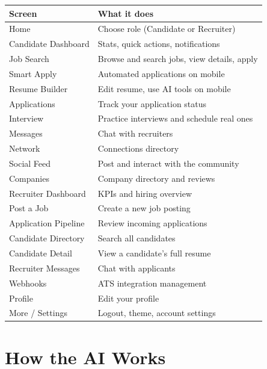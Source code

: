 \documentclass[12pt, a4paper]{report}
\begin{document}
\begin{center}
\begin{tabularx}{\textwidth}{lX}
\toprule
\textbf{Screen} & \textbf{What it does} \\
\midrule
Home                & Choose role (Candidate or Recruiter) \\
Candidate Dashboard & Stats, quick actions, notifications \\
Job Search          & Browse and search jobs, view details, apply \\
Smart Apply         & Automated applications on mobile \\
Resume Builder      & Edit resume, use AI tools on mobile \\
Applications        & Track your application status \\
Interview           & Practice interviews and schedule real ones \\
Messages            & Chat with recruiters \\
Network             & Connections directory \\
Social Feed         & Post and interact with the community \\
Companies           & Company directory and reviews \\
Recruiter Dashboard & KPIs and hiring overview \\
Post a Job          & Create a new job posting \\
Application Pipeline& Review incoming applications \\
Candidate Directory & Search all candidates \\
Candidate Detail    & View a candidate's full resume \\
Recruiter Messages  & Chat with applicants \\
Webhooks            & ATS integration management \\
Profile             & Edit your profile \\
More / Settings     & Logout, theme, account settings \\
\bottomrule
\end{tabularx}
\end{center}

\chapter{How the AI Works}
\end{document}
